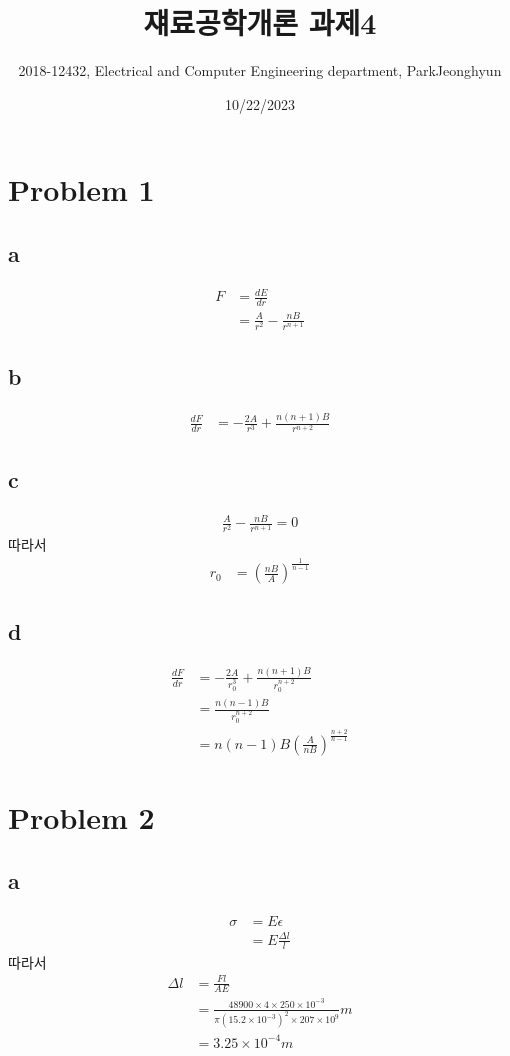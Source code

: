 \documentclass[a4paper]{oblivoir}
\title{쟤료공학개론 과제4}
\author{2018-12432, Electrical and Computer Engineering department, ParkJeonghyun}
\date{10/22/2023}
\begin{document}
\maketitle
\section{Problem 1}
\subsection{a}
\begin{align}
	F &= \frac{dE}{dr}\\
	&=\frac{A}{r^{2}} - \frac{nB}{r^{n+1}}
\end{align}

\subsection{b}
\begin{align}
	\frac{dF}{dr} &= -\frac{2A}{r^{3}} + \frac{n(n+1)B}{r^{n+2}}
\end{align}

\subsection{c}
\begin{align}
	\frac{A}{r^{2}} - \frac{nB}{r^{n+1}} = 0
\end{align}
따라서
\begin{align}
	r_{0} &= \left( \frac{nB}{A}\right)^{\frac{1}{n-1}}
\end{align}

\subsection{d}
\begin{align}
	\frac{dF}{dr} &= -\frac{2A}{r_{0}^{3}} + \frac{n(n+1)B}{r_{0}^{n+2}}\\
	&= \frac{n(n-1)B}{r_{0}^{n+2}}\\
	&= n(n-1)B\left( \frac{A}{nB}\right)^{\frac{n+2}{n-1}}
\end{align}

\section{Problem 2}
\subsection{a}
\begin{align}
	\sigma &= E\epsilon\\
	&= E\frac{\Delta l}{l}
\end{align}
따라서
\begin{align}
	\Delta l &= \frac{Fl}{AE}\\
	&= \frac{48900 \times 4 \times 250 \times 10^{-3}}{\pi(15.2\times 10^{-3})^{2}\times 207\times10^{9}} m\\
	&= 3.25 \times 10^{-4}m
\end{align}
\end{document}
